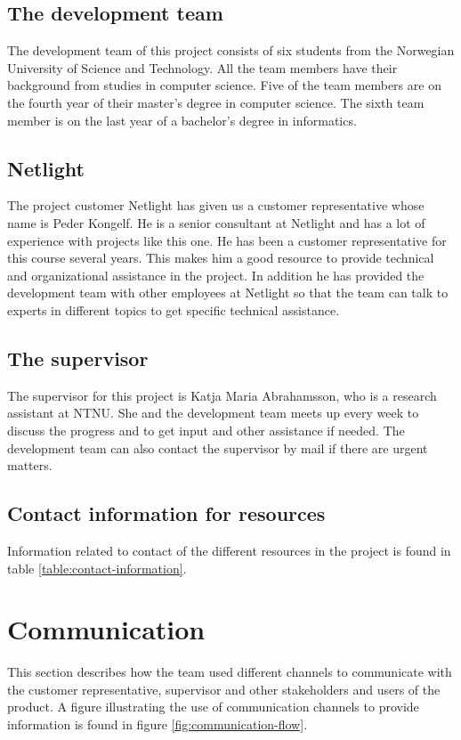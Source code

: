 \subsection{The development team}
The development team of this project consists of six students from the Norwegian University of Science and Technology. All the team members have their background from studies in computer science. Five of the team members are on the fourth year of their master’s degree in computer science. The sixth team member is on the last year of a bachelor’s degree in informatics.
\subsection{Netlight}
The project customer Netlight has given us a customer representative whose name is Peder Kongelf. He is a senior consultant at Netlight and has a lot of experience with projects like this one. He has been a customer representative for this course several years. This makes him a good resource to provide technical and organizational assistance in the project. In addition he has provided the development team with other employees at Netlight so that the team can talk to experts in different topics to get specific technical assistance.
\subsection{The supervisor}
The supervisor for this project is Katja Maria Abrahamsson, who is a research assistant at NTNU. She and the development team meets up every week to discuss the progress and to get input and other assistance if needed. The development team can also contact the supervisor by mail if there are urgent matters. 
\subsection{Contact information for resources}
Information related to contact of the different resources in the project is found in table \ref{table:contact-information}.



\section{Communication}
This section describes how the team used different channels to communicate with the customer representative, supervisor and other stakeholders and users of the product. A figure illustrating the use of communication channels to provide information is found in figure \ref{fig:communication-flow}.

